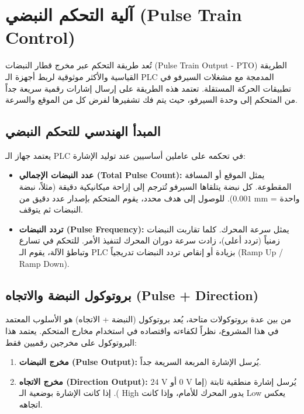 \section{آلية التحكم النبضي (\textenglish{Pulse Train Control})}
\label{sec:pulse_control}

تُعد طريقة التحكم عبر مخرج قطار النبضات (\textenglish{Pulse Train Output - PTO}) الطريقة القياسية والأكثر موثوقية لربط أجهزة الـ \textenglish{PLC} المدمجة مع مشغلات السيرفو في تطبيقات الحركة المستقلة. تعتمد هذه الطريقة على إرسال إشارات رقمية سريعة جداً من المتحكم إلى وحدة السيرفو، حيث يتم فك تشفيرها لفرض كل من الموقع والسرعة.

\subsection{المبدأ الهندسي للتحكم النبضي}
يعتمد جهاز الـ \textenglish{PLC} في تحكمه على عاملين أساسيين عند توليد الإشارة:
\begin{itemize}
    \item \textbf{عدد النبضات الإجمالي (\textenglish{Total Pulse Count}):} يمثل الموقع أو المسافة المقطوعة. كل نبضة يتلقاها السيرفو تُترجم إلى إزاحة ميكانيكية دقيقة (مثلاً، نبضة واحدة = $0.001\text{ mm}$). للوصول إلى هدف محدد، يقوم المتحكم بإصدار عدد دقيق من النبضات ثم يتوقف.
    \item \textbf{تردد النبضات (\textenglish{Pulse Frequency}):} يمثل سرعة المحرك. كلما تقاربت النبضات زمنياً (تردد أعلى)، زادت سرعة دوران المحرك لتنفيذ الأمر. للتحكم في تسارع وتباطؤ الآلة، يقوم الـ \textenglish{PLC} بزيادة أو إنقاص تردد النبضات تدريجياً (\textenglish{Ramp Up / Ramp Down}).
\end{itemize}

\subsection{بروتوكول النبضة والاتجاه (\textenglish{Pulse + Direction})}
من بين عدة بروتوكولات متاحة، يُعد بروتوكول (النبضة + الاتجاه) هو الأسلوب المعتمد في هذا المشروع، نظراً لكفاءته واقتصاده في استخدام مخارج المتحكم. يعتمد هذا البروتوكول على مخرجين رقميين فقط:
\begin{enumerate}
    \item \textbf{مخرج النبضات (\textenglish{Pulse Output}):} يُرسل الإشارة المربعة السريعة جداً.
    \item \textbf{مخرج الاتجاه (\textenglish{Direction Output}):} يُرسل إشارة منطقية ثابتة (إما $0\text{ V}$ أو $24\text{ V}$). إذا كانت الإشارة بوضعية الـ \textenglish{High} يدور المحرك للأمام، وإذا كانت \textenglish{Low} يعكس اتجاهه.
\end{enumerate}



